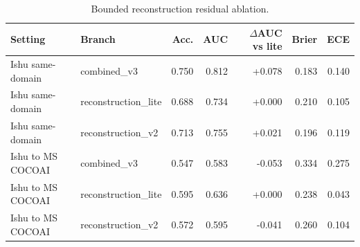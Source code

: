 \begin{table}[t]
\centering
\small
\caption{Bounded reconstruction residual ablation.}
\label{tab:reconstruction-ablation}
\begin{tabular}{l l r r r r r}
\toprule
Setting & Branch & Acc. & AUC & $\Delta$AUC vs lite & Brier & ECE \\
\midrule
Ishu same-domain & combined\_v3 & 0.750 & 0.812 & +0.078 & 0.183 & 0.140 \\
Ishu same-domain & reconstruction\_lite & 0.688 & 0.734 & +0.000 & 0.210 & 0.105 \\
Ishu same-domain & reconstruction\_v2 & 0.713 & 0.755 & +0.021 & 0.196 & 0.119 \\
Ishu to MS COCOAI & combined\_v3 & 0.547 & 0.583 & -0.053 & 0.334 & 0.275 \\
Ishu to MS COCOAI & reconstruction\_lite & 0.595 & 0.636 & +0.000 & 0.238 & 0.043 \\
Ishu to MS COCOAI & reconstruction\_v2 & 0.572 & 0.595 & -0.041 & 0.260 & 0.104 \\
\bottomrule
\end{tabular}
\end{table}
